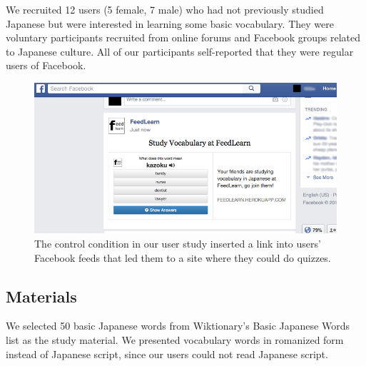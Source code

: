 \documentclass{sigchi}
\begin{document}
We recruited 12 users (5 female, 7 male) who had not previously studied Japanese but were interested in learning some basic vocabulary. They were voluntary participants recruited from online forums and Facebook groups related to Japanese culture. All of our participants self-reported that they were regular users of Facebook. %



\begin{figure}
\centering
\includegraphics[width=1.0\columnwidth]{feedlearn-link-screenshot}
\caption{The control condition in our user study inserted a link into users' Facebook feeds that led them to a site where they could do quizzes.}
\label{fig:control}
\end{figure}

\subsection{Materials}

We selected 50 basic Japanese words from Wiktionary's Basic Japanese Words list as the study material. We presented vocabulary words in romanized form instead of Japanese script, since our users could not read Japanese script.

\end{document}
